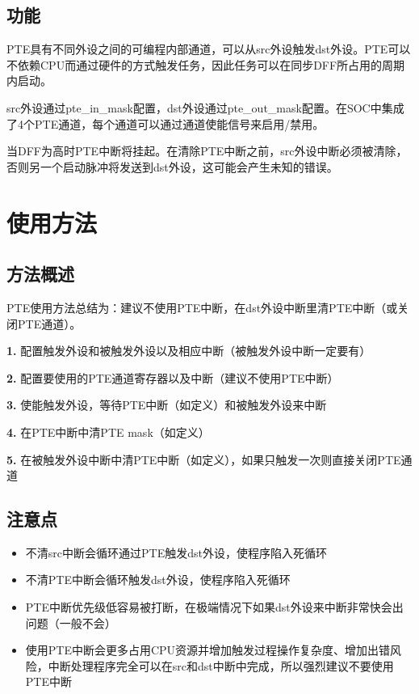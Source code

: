 \documentclass[
  12pt,
]{book}
\begin{document}
\hypertarget{ux529fux80fd}{%
\subsection{功能}\label{ux529fux80fd}}

PTE具有不同外设之间的可编程内部通道，可以从src外设触发dst外设。PTE可以不依赖CPU而通过硬件的方式触发任务，因此任务可以在同步DFF所占用的周期内启动。

src外设通过pte\_in\_mask配置，dst外设通过pte\_out\_mask配置。在SOC中集成了4个PTE通道，每个通道可以通过通道使能信号来启用/禁用。

当DFF为高时PTE中断将挂起。在清除PTE中断之前，src外设中断必须被清除，否则另一个启动脉冲将发送到dst外设，这可能会产生未知的错误。

\hypertarget{ux4f7fux7528ux65b9ux6cd5-4}{%
\section{使用方法}\label{ux4f7fux7528ux65b9ux6cd5-4}}

\hypertarget{ux65b9ux6cd5ux6982ux8ff0-4}{%
\subsection{方法概述}\label{ux65b9ux6cd5ux6982ux8ff0-4}}

PTE使用方法总结为：建议不使用PTE中断，在dst外设中断里清PTE中断（或关闭PTE通道）。

\textbf{1.} 配置触发外设和被触发外设以及相应中断（被触发外设中断一定要有）

\textbf{2.} 配置要使用的PTE通道寄存器以及中断（建议不使用PTE中断）

\textbf{3.} 使能触发外设，等待PTE中断（如定义）和被触发外设来中断

\textbf{4.} 在PTE中断中清PTE mask（如定义）

\textbf{5.} 在被触发外设中断中清PTE中断（如定义），如果只触发一次则直接关闭PTE通道

\hypertarget{ux6ce8ux610fux70b9-4}{%
\subsection{注意点}\label{ux6ce8ux610fux70b9-4}}

\begin{itemize}
\item
  不清src中断会循环通过PTE触发dst外设，使程序陷入死循环
\item
  不清PTE中断会循环触发dst外设，使程序陷入死循环
\item
  PTE中断优先级低容易被打断，在极端情况下如果dst外设来中断非常快会出问题（一般不会）
\item
  使用PTE中断会更多占用CPU资源并增加触发过程操作复杂度、增加出错风险，中断处理程序完全可以在src和dst中断中完成，所以强烈建议不要使用PTE中断
\end{itemize}
\end{document}
